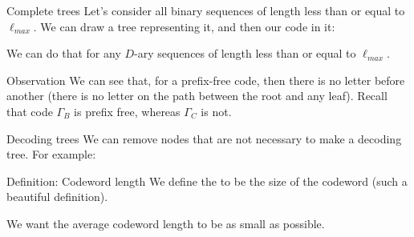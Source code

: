 \documentclass[a4paper]{article}
\begin{document}
\begin{parag}{Complete trees}
    Let's consider all binary sequences of length less than or equal to $\ell_{max}$. We can draw a tree representing it, and then our code in it:

    We can do that for any $D$-ary sequences of length less than or equal to $\ell_{max}$.

    \begin{subparag}{Observation}
        We can see that, for a prefix-free code, then there is no letter before another (there is no letter on the path between the root and any leaf). Recall that code $\Gamma_B$ is prefix free, whereas $\Gamma_C$ is not.
    \end{subparag}

\end{parag}

\begin{parag}{Decoding trees}
    We can remove nodes that are not necessary to make a decoding tree. For example:
\end{parag}

\begin{parag}{Definition: Codeword length}
    We define the  to be the size of the codeword (such a beautiful definition).

    We want the average codeword length to be as small as possible.
\end{parag}
\end{document}
